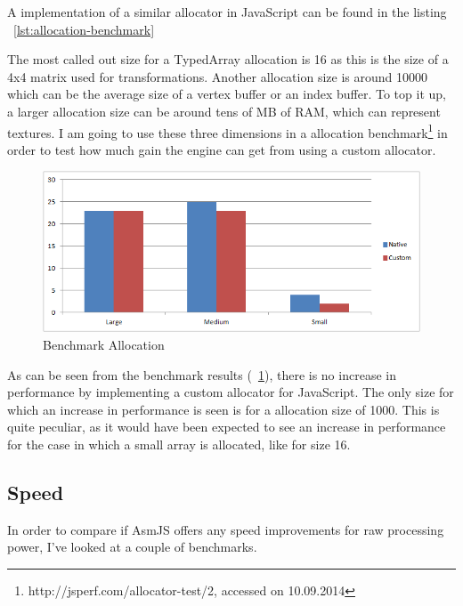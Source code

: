 A implementation of a similar allocator in JavaScript can be found in the listing ~\ref{lst:allocation-benchmark}

\lstset{caption=Allocation benchmark (allocator.js), label=lst:allocation-benchmark}


The most called out size for a TypedArray allocation is 16 as this is the size of a 4x4 matrix used for transformations. Another allocation size is around 10000 which can be the average size of a vertex buffer or an index buffer. To top it up, a larger allocation size can be around tens of MB of RAM, which can represent textures. I am going to use these three dimensions in a allocation benchmark\footnote{http://jsperf.com/allocator-test/2, accessed on 10.09.2014} in order to test how much gain the engine can get from using a custom allocator.

\begin{center}
	\begin{figure}[here!]
		
		\includegraphics[width=\textwidth]{src/img/chart1.png}
		\caption{Benchmark Allocation}
		\label{img:chart1}
	\end{figure}
\end{center}

As can be seen from the benchmark results (~\ref{img:chart1}), there is no increase in performance by implementing a custom allocator for JavaScript. The only size for which an increase in performance is seen is for a allocation size of 1000. This is quite peculiar, as it would have been expected to see an increase in performance for the case in which a small array is allocated, like for size 16.

\subsection{Speed}

In order to compare if AsmJS offers any speed improvements for raw processing power, I've looked at a couple of benchmarks.

